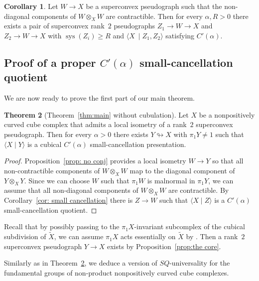 \documentclass[12pt,oneside]{amsart}
\theoremstyle{definition}
\newtheorem{thm}{Theorem}[section]
\newtheorem{cor}[thm]{Corollary}
\theoremstyle{definition}
\theoremstyle{remark}
\DeclareMathOperator{\sys}{\mathrm sys}
\begin{document}
\begin{cor}\label{cor:2 pseudographs}
    Let $W\to X$ be a superconvex pseudograph such that the non-diagonal components of $W \otimes_X W$ are contractible.
    Then for every $\alpha, R>0$ there exists a pair of superconvex rank~$2$ pseudographs $Z_1\to W\to X$ and $Z_2\to W \to X$ with $\sys(Z_i)\geq R$ and $\langle X\ \mid Z_1, Z_2\rangle$ satisfying $C'(\alpha)$.
\end{cor}

\subsection{Proof of  a proper $C'(\alpha)$ small-cancellation quotient}\label{sec: proof without cocompactness}
We are now ready to prove the first part of our main theorem.
\begin{thm}[Theorem~\ref{thm:main} without cubulation]\label{thm: main without cubulation}
     Let $X$ be a nonpositively curved cube complex that admits a local isometry of a rank~$2$ superconvex pseudograph. 
    Then for every $\alpha> 0$ there exists $Y\looparrowright X$ with $\pi_1 Y\neq 1$ such that $\langle X\mid Y\rangle$ is a cubical $C'(\alpha)$ small-cancellation presentation. 
\end{thm}

\begin{proof}
Proposition~\ref{prop: no conj} provides a local isometry $W\rightarrow Y$ so that all non-contractible components of  $W \otimes_X W$ map to the diagonal component of $Y\otimes_X Y$.
Since we can choose $W$ such that $\pi_1 W$ is malnormal in $\pi_1 Y$, we can assume that all non-diagonal components of $W \otimes_X W$ are contractible.
%
By Corollary~\ref{cor: small cancellation} there is $Z\to W$ such that $\langle X\mid Z\rangle$ is a $C'(\alpha)$ small-cancellation quotient.
\end{proof}

 Recall that  by possibly passing to the $\pi_1 X$-invariant subcomplex of the cubical subdivision of $\widetilde X$, we can assume  $\pi_1 X$ acts essentially on $\widetilde X$ by \cite[Prop~3.5]{CapraceSageev2011}. Then  a rank~$2$ superconvex pseudograph $Y\rightarrow X$
 exists by Proposition~\ref{prop:the core}.
 
 Similarly as in Theorem~\ref{thm: main without cubulation}, we deduce a version of $SQ$-universality for the fundamental groups of non-product nonpositively curved cube complexes.
\end{document}
